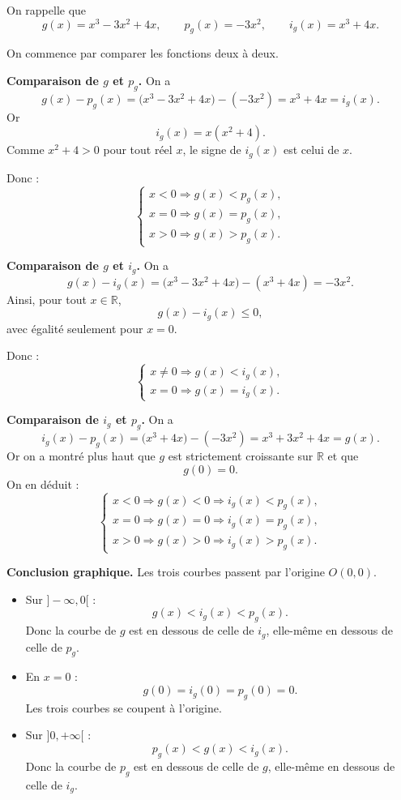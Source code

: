 \documentclass[11pt,a4paper]{article}
\begin{document}
On rappelle que
\[
g(x)=x^3-3x^2+4x,\qquad p_g(x)=-3x^2,\qquad i_g(x)=x^3+4x.
\]

On commence par comparer les fonctions deux à deux.

\medskip

\textbf{Comparaison de $g$ et $p_g$.}  
On a
\[
g(x)-p_g(x)=\bigl(x^3-3x^2+4x\bigr)-(-3x^2)=x^3+4x=i_g(x).
\]
Or
\[
i_g(x)=x(x^2+4).
\]
Comme $x^2+4>0$ pour tout réel $x$, le signe de $i_g(x)$ est celui de $x$.

Donc :
\[
\begin{cases}
x<0 \Rightarrow g(x)<p_g(x),\\
x=0 \Rightarrow g(x)=p_g(x),\\
x>0 \Rightarrow g(x)>p_g(x).
\end{cases}
\]

\medskip

\textbf{Comparaison de $g$ et $i_g$.}  
On a
\[
g(x)-i_g(x)=\bigl(x^3-3x^2+4x\bigr)-(x^3+4x)=-3x^2.
\]
Ainsi, pour tout $x\in\mathbb{R}$,
\[
g(x)-i_g(x)\le 0,
\]
avec égalité seulement pour $x=0$.

Donc :
\[
\begin{cases}
x\neq 0 \Rightarrow g(x)<i_g(x),\\
x=0 \Rightarrow g(x)=i_g(x).
\end{cases}
\]

\medskip

\textbf{Comparaison de $i_g$ et $p_g$.}  
On a
\[
i_g(x)-p_g(x)=\bigl(x^3+4x\bigr)-(-3x^2)=x^3+3x^2+4x=g(x).
\]
Or on a montré plus haut que $g$ est strictement croissante sur $\mathbb{R}$ et que
\[
g(0)=0.
\]
On en déduit :
\[
\begin{cases}
x<0 \Rightarrow g(x)<0 \Rightarrow i_g(x)<p_g(x),\\
x=0 \Rightarrow g(x)=0 \Rightarrow i_g(x)=p_g(x),\\
x>0 \Rightarrow g(x)>0 \Rightarrow i_g(x)>p_g(x).
\end{cases}
\]

\medskip

\textbf{Conclusion graphique.}  
Les trois courbes passent par l’origine $O(0,0)$.

\begin{itemize}
    \item Sur $]-\infty,0[$ :
    \[
    g(x)<i_g(x)<p_g(x).
    \]
    Donc la courbe de $g$ est en dessous de celle de $i_g$, elle-même en dessous de celle de $p_g$.

    \item En $x=0$ :
    \[
    g(0)=i_g(0)=p_g(0)=0.
    \]
    Les trois courbes se coupent à l’origine.

    \item Sur $]0,+\infty[$ :
    \[
    p_g(x)<g(x)<i_g(x).
    \]
    Donc la courbe de $p_g$ est en dessous de celle de $g$, elle-même en dessous de celle de $i_g$.
\end{itemize}
\end{document}
